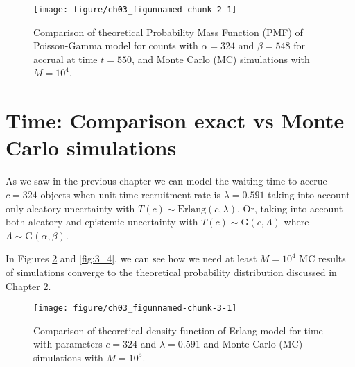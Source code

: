 \begin{figure}
\begin{knitrout}
\color{fgcolor}
\texttt{[image: figure/ch03\_figunnamed-chunk-2-1]} 
\end{knitrout}
\caption{Comparison of theoretical Probability Mass Function (PMF) of Poisson-Gamma model for counts with $\alpha = 324$ and $\beta = 548$ for accrual at time $t=550$, and Monte Carlo (MC) simulations with $M=10^4$.}
\label{fig:3_2}
\end{figure}



\section{Time: Comparison exact vs Monte Carlo simulations}


As we saw in the previous chapter we can model the waiting time to accrue $c = 324$ objects when unit-time recruitment rate is $\lambda = 0.591$ taking into account only aleatory uncertainty with $T(c)\sim \textrm{Erlang}(c,\lambda)$. Or, taking into account both aleatory and epistemic uncertainty with $T(c)\sim\textrm{G}(c, \Lambda)$ where $\Lambda\sim \textrm{G}(\alpha,\beta)$.


In Figures \ref{fig:3_3} and \ref{fig:3_4}, we can see how we need at least $M=10^4$ MC results of simulations converge to the theoretical probability distribution discussed in Chapter 2.

% 
% 

\begin{figure}
\begin{knitrout}
\color{fgcolor}
\texttt{[image: figure/ch03\_figunnamed-chunk-3-1]} 
\end{knitrout}
\caption{Comparison of theoretical density function of Erlang model for time with parameters $c = 324$ and $\lambda = 0.591$ and Monte Carlo (MC) simulations with $M=10^5$.}
\label{fig:3_3}
\end{figure}


